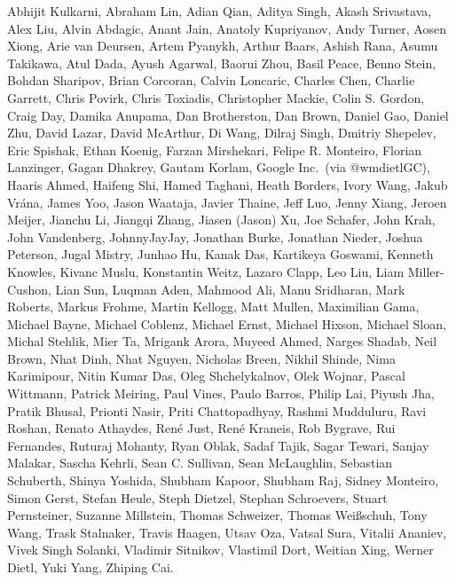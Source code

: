 Abhijit Kulkarni,
Abraham Lin,
Adian Qian,
Aditya Singh,
Akash Srivastava,
Alex Liu,
Alvin Abdagic,
Anant Jain,
Anatoly Kupriyanov,
Andy Turner,
Aosen Xiong,
Arie van Deursen,
Artem Pyanykh,
Arthur Baars,
Ashish Rana,
Asumu Takikawa,
Atul Dada,
Ayush Agarwal,
Baorui Zhou,
Basil Peace,
Benno Stein,
Bohdan Sharipov,
Brian Corcoran,
Calvin Loncaric,
Charles Chen,
Charlie Garrett,
Chris Povirk,
Chris Toxiadis,
Christopher Mackie,
Colin S. Gordon,
Craig Day,
Damika Anupama,
Dan Brotherston,
Dan Brown,
Daniel Gao,
Daniel Zhu,
David Lazar,
David McArthur,
Di Wang,
Dilraj Singh,
Dmitriy Shepelev,
Eric Spishak,
Ethan Koenig,
Farzan Mirshekari,
Felipe R. Monteiro,
Florian Lanzinger,
Gagan Dhakrey,
Gautam Korlam,
Google Inc.\ (via @wmdietlGC),
Haaris Ahmed,
Haifeng Shi,
Hamed Taghani,
Heath Borders,
Ivory Wang,
Jakub Vr\'ana,
James Yoo,
Jason Waataja,
Javier Thaine,
Jeff Luo,
Jenny Xiang,
Jeroen Meijer,
Jianchu Li,
Jiangqi Zhang,
Jiasen (Jason) Xu,
Joe Schafer,
John Krah,
John Vandenberg,
JohnnyJayJay,
Jonathan Burke,
Jonathan Nieder,
Joshua Peterson,
Jugal Mistry,
Junhao Hu,
Kanak Das,
Kartikeya Goswami,
Kenneth Knowles,
Kivanc Muslu,
Konstantin Weitz,
Lazaro Clapp,
Leo Liu,
Liam Miller-Cushon,
Lian Sun,
Luqman Aden,
Mahmood Ali,
Manu Sridharan,
Mark Roberts,
Markus Frohme,
Martin Kellogg,
Matt Mullen,
Maximilian Gama,
Michael Bayne,
Michael Coblenz,
Michael Ernst,
Michael Hixson,
Michael Sloan,
Michal Stehlik,
Mier Ta,
Mrigank Arora,
Muyeed Ahmed,
Narges Shadab,
Neil Brown,
Nhat Dinh,
Nhat Nguyen,
Nicholas Breen,
Nikhil Shinde,
Nima Karimipour,
Nitin Kumar Das,
Oleg Shchelykalnov,
Olek Wojnar,
Pascal Wittmann,
Patrick Meiring,
Paul Vines,
Paulo Barros,
Philip Lai,
Piyush Jha,
Pratik Bhusal,
Prionti Nasir,
Priti Chattopadhyay,
Rashmi Mudduluru,
Ravi Roshan,
Renato Athaydes,
Ren\'e Just,
Ren\'e Kraneis,
Rob Bygrave,
Rui Fernandes,
Ruturaj Mohanty,
Ryan Oblak,
Sadaf Tajik,
Sagar Tewari,
Sanjay Malakar,
Sascha Kehrli,
Sean C. Sullivan,
Sean McLaughlin,
Sebastian Schuberth,
Shinya Yoshida,
Shubham Kapoor,
Shubham Raj,
Sidney Monteiro,
Simon Gerst,
Stefan Heule,
Steph Dietzel,
Stephan Schroevers,
Stuart Pernsteiner,
Suzanne Millstein,
Thomas Schweizer,
Thomas Wei\ss schuh,
Tony Wang,
Trask Stalnaker,
Travis Haagen,
Utsav Oza,
Vatsal Sura,
Vitalii Ananiev,
Vivek Singh Solanki,
Vladimir Sitnikov,
Vlastimil Dort,
Weitian Xing,
Werner Dietl,
Yuki Yang,
Zhiping Cai.
